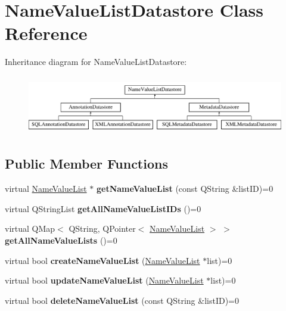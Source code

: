 \hypertarget{class_name_value_list_datastore}{}\section{Name\+Value\+List\+Datastore Class Reference}
\label{class_name_value_list_datastore}
Inheritance diagram for Name\+Value\+List\+Datastore\+:\begin{figure}[H]
\begin{center}
\leavevmode
\includegraphics[height=2.608696cm]{class_name_value_list_datastore}
\end{center}
\end{figure}
\subsection*{Public Member Functions}
\begin{DoxyCompactItemize}
\item 
\mbox{\label{class_name_value_list_datastore_a9136e5c8a251c68b61d1fea4ed9ad79a}} 
virtual \hyperlink{class_name_value_list}{Name\+Value\+List} $\ast$ {\bfseries get\+Name\+Value\+List} (const Q\+String \&list\+ID)=0
\item 
\mbox{\label{class_name_value_list_datastore_a5938b3d75544f4eb2ac94e5159dc2b13}} 
virtual Q\+String\+List {\bfseries get\+All\+Name\+Value\+List\+I\+Ds} ()=0
\item 
\mbox{\label{class_name_value_list_datastore_a17bd7aca3d557abf1f271b458b1fc84b}} 
virtual Q\+Map$<$ Q\+String, Q\+Pointer$<$ \hyperlink{class_name_value_list}{Name\+Value\+List} $>$ $>$ {\bfseries get\+All\+Name\+Value\+Lists} ()=0
\item 
\mbox{\label{class_name_value_list_datastore_a236c5c80ce8a6c0142c47951c9bc1106}} 
virtual bool {\bfseries create\+Name\+Value\+List} (\hyperlink{class_name_value_list}{Name\+Value\+List} $\ast$list)=0
\item 
\mbox{\label{class_name_value_list_datastore_acc78dd756ee434600efbd1d49aaabcf5}} 
virtual bool {\bfseries update\+Name\+Value\+List} (\hyperlink{class_name_value_list}{Name\+Value\+List} $\ast$list)=0
\item 
\mbox{\label{class_name_value_list_datastore_aeaf41750a36911031ed41c9fba294b74}} 
virtual bool {\bfseries delete\+Name\+Value\+List} (const Q\+String \&list\+ID)=0
\end{DoxyCompactItemize}


